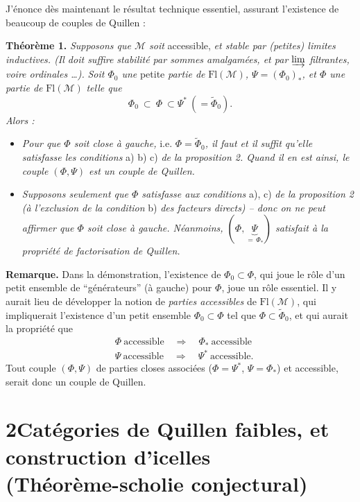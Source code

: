 \documentclass[11pt]{article}
\newcommand{\printedpage}[1]{\marginpar{\footnotesize p.~#1}}
\newcommand{\msp}[1]{\marginpar{\footnotesize [#1]}}
\newcommand{\Fl}{\mathrm{Fl}}
\newcommand{\cM}{\mathcal{M}}
\begin{document}
J'énonce dès maintenant le résultat technique essentiel, assurant l'existence de beaucoup de couples de Quillen :

\setcounter{footnote}{4}

\printedpage{4}
\msp{page 6}\textbf{Théorème 1.} \textit{Supposons que $\cM$ soit} accessible, \textit{et stable par (petites) limites inductives. (Il doit suffire stabilité par sommes amalgamées, et par $\varinjlim$ filtrantes, voire ordinales \dots).} \textit{Soit $\Phi_0$ une} petite \textit{partie de} $\Fl(\cM)$\textit{, $\Psi=(\Phi_0)_*$, et $\Phi$ une partie de} $\Fl(\cM)$ \textit{telle que}
\[
\Phi_0\ \subset\ \Phi\ \subset\Psi^*\ (=\widetilde{\Phi}_0).
\]
\textit{Alors :}

\begin{itemize}[leftmargin=2.5em]
\item[a)] \textit{Pour que $\Phi$ soit close à gauche,} i.e. $\Phi=\widetilde{\Phi}_0$\textit{, il faut et il suffit qu'elle satisfasse les conditions} a) b) c) \textit{de la proposition 2. Quand il en est ainsi, le couple $(\Phi,\Psi)$ est un couple de Quillen.}

\item[b)] \textit{Supposons seulement que $\Phi$ satisfasse aux conditions} a), c) \textit{de la proposition 2 (à l'exclusion de la condition} b) \textit{des facteurs directs) – donc on ne peut affirmer que $\Phi$ soit close à gauche. Néanmoins, $(\Phi,\underbrace{\Psi}_{=\,\Phi_*})$ satisfait à la propriété de factorisation de Quillen.}
\end{itemize}

\textbf{Remarque.} Dans la démonstration, l'existence de $\Phi_0\subset\Phi$, qui joue le rôle d'un petit ensemble de “générateurs” (à gauche) pour $\Phi$, joue un rôle essentiel. Il y aurait lieu de développer la notion de \textit{parties accessibles}
\msp{page 7}
de $\Fl(\cM)$, qui impliquerait l'existence d'un petit ensemble $\Phi_0\subset\Phi$ tel que $\Phi\subset\widetilde{\Phi}_0$, et qui aurait la propriété que
\[
\begin{aligned}
&\Phi\ \text{accessible}\quad\Longrightarrow\quad\Phi_*\ \text{accessible}\\
&\Psi\ \text{accessible}\quad\Longrightarrow\quad\Psi^*\ \text{accessible.}
\end{aligned}
\]
Tout couple $(\Phi,\Psi)$ de parties closes associées ($\Phi=\Psi^*$, $\Psi=\Phi_*$) et accessible, serait donc un couple de Quillen.

\section*{2\quad Catégories de Quillen faibles, et construction d'icelles\\[0.3ex] (Théorème-scholie conjectural)}
\end{document}
